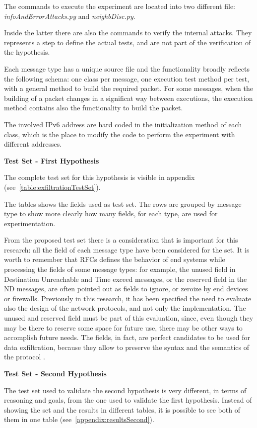 \documentclass[12pt]{article}
\begin{document}
The commands to execute the experiment are located into two different file: \textit{infoAndErrorAttacks.py} and \textit{neighbDisc.py}. 

Inside the latter there are also the commands to verify the internal attacks. They represents a step to define the actual tests, and are not part of the verification of the hypothesis.

Each message type has a unique source file and the functionality broadly reflects the following schema: one class per message, one execution test method per test, with a general method to build the required packet. For some messages, when the building of a packet changes in a significat way between executions, the execution method contains also the functionality to build the packet.

The involved IPv6 address are hard coded in the initialization method of each class, which is the place to modify the code to perform the experiment with different addresses.

\textbf{Test Set - First Hypothesis}

The complete test set for this hypothesis is visible in appendix (see~\cref{table:exfiltrationTestSet}).

The tables shows the fields used as test set. The rows are grouped by message type to show more clearly how many fields, for each type, are used for experimentation.

From the proposed test set there is a consideration that is important for this research: all the field of each message type have been considered for the set. It is worth to remember that RFCs defines the behavior of end systems while processing  the fields of some message types: for example, the unused field in Destination Unreachable and Time exceed messages, or the reserved field in the ND messages, are often pointed out as fields to ignore, or zeroize by end devices or firewalls. Previously in this research, it has been specified the need to evaluate also the design of the network protocols, and not only the implementation. The unused and reserved field must be part of this evaluation, since, even though they may be there to reserve some space for future use, there may be other ways to accomplish future needs. The fields, in fact, are perfect candidates to be used for data exfiltration, because they allow to preserve the syntax and the semantics of the protocol \cite{lewandowski}.

\textbf{Test Set - Second Hypothesis}

The test set used to validate the second hypothesis is very different, in terms of reasoning and goals, from the one used to validate the first hypothesis. Instead of showing the set and the results in different tables, it is possible to see both of them in one table (see~\cref{appendix:resultsSecond}).
\end{document}
